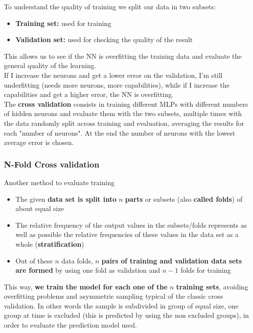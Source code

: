 To understand the quality of training we split our data in two subsets: 
\begin{itemize}
	\item \textbf{Training set:} used for training
	\item \textbf{Validation set:} used for checking the quality of the result
\end{itemize}
This allows us to see if the NN is overfitting the training data and evaluate the general quality of the learning. \\

If I increase the neurons and get a lower error on the validation, I'm still underfitting (needs more neurons, more capabilities), while if I increase the capabilities and get a higher error, the NN is overfitting.\\

The \textbf{cross validation} consists in training different MLPs with different numbers of hidden neurons and evaluate them with the two subsets, multiple times with the data randomly split across training and evaluation, averaging the results for each "number of neurons". At the end the number of neurons with the lowest average error is chosen.\\

\newpage

\subsubsection{N-Fold Cross validation} 

Another method to evaluate training
\begin{itemize}
	\item The given \textbf{data set is split into} $n$ \textbf{parts} or subsets (also \textbf{called folds}) of about equal size
	\item The relative frequency of the output values in the subsets/folds represents as well as possible the relative frequencies of these values in the data set as a whole (\textbf{stratification})
	\item Out of these $n$ data folds, $n$ \textbf{pairs of training and validation data sets are formed} by using one fold as validation and $n-1$ folds for training
\end{itemize}

This way, \textbf{we train the model for each one of the} $n$ \textbf{training sets}, avoiding overfitting problems and asymmetric sampling typical of the classic cross validation. In other words the sample is subdivided in group of equal size, one group at time is excluded (this is predicted by using the non excluded groups), in order to evaluate the prediction model used. \\

